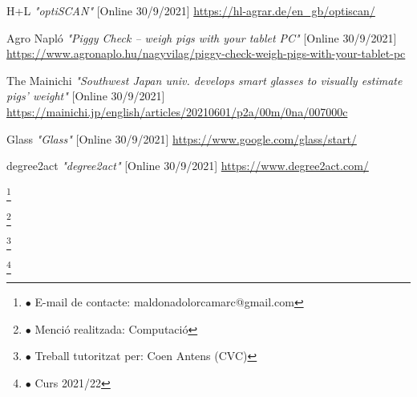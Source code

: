 \documentclass[12pt,a4paper]{article}
\newcommand\blfootnote[1]{%
  \begingroup
  \renewcommand\thefootnote{}\footnote{#1}%
  \addtocounter{footnote}{-1}%
  \endgroup
}
\begin{document}
\begin{thebibliography}{5}
    H+L \emph{"optiSCAN"} [Online 30/9/2021]
    \url{https://hl-agrar.de/en_gb/optiscan/}

    Agro Napló \emph{"Piggy Check – weigh pigs with your tablet PC"} [Online 30/9/2021]
    \url{https://www.agronaplo.hu/nagyvilag/piggy-check-weigh-pigs-with-your-tablet-pc}

    The Mainichi \emph{"Southwest Japan univ. develops smart glasses to visually estimate pigs' weight"} [Online 30/9/2021]
    \url{https://mainichi.jp/english/articles/20210601/p2a/00m/0na/007000c}

    Glass \emph{"Glass"} [Online 30/9/2021]
    \url{https://www.google.com/glass/start/}
    
    degree2act \emph{"degree2act"} [Online 30/9/2021]
    \url{https://www.degree2act.com/}

\end{thebibliography}



\setcounter{section}{1}

\blfootnote{$\bullet$ E-mail de contacte: maldonadolorcamarc@gmail.com}
\blfootnote{$\bullet$ Menció realitzada: Computació}
\blfootnote{$\bullet$ Treball tutoritzat per: Coen Antens (CVC)}
\blfootnote{$\bullet$ Curs 2021/22}
\end{document}
